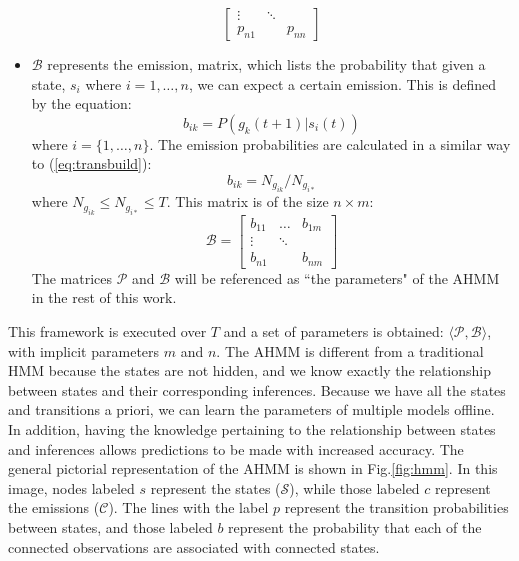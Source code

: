 \documentclass[letterpaper, 10 pt, conference]{ieeeconf}  %
\newcommand\NB[1]{$\spadesuit$\footnote{NB: #1}}
\begin{document}
\begin{itemize}
\begin{equation}
\begin{bmatrix}
                        \vdots & \ddots & \\
                        p_{n1} &    & p_{nn}
                    \end{bmatrix}
        \end{equation}
    \item $\mathcal{B}$ represents the emission, matrix, which lists the probability that given a state, $s_i$ where $i = 1,\ldots,n$, we can expect a certain emission. This is defined by the equation:
        \begin{equation} \label{eq:obsref}
            b_{ik} = P(g_k(t+1) \vert s_i(t))
        \end{equation}
        where $i = \{1,\ldots,n\}$. The emission probabilities are calculated in a similar way to (\ref{eq:transbuild}):
        \begin{equation} \label{eq:obsbuild}
            b_{ik} = N_{g_{ik}}/N_{g_{i*}}
        \end{equation} 
        where $N_{g_{ik}} \leq N_{g_{i*}} \leq T$. This matrix is of the size $n\times m$:
        \begin{equation}
            \mathcal{B} = 
                    \begin{bmatrix}
                        b_{11} & \dots & b_{1m} \\
                        \vdots & \ddots & \\
                        b_{n1} &    & b_{nm}
                    \end{bmatrix}
        \end{equation}
        The matrices $\mathcal{P}$ and $\mathcal{B}$ will be referenced as ``the parameters" of the AHMM in the rest of this work. 
\end{itemize}

This framework is executed over $T$ and a set of parameters is obtained: $\langle \mathcal{P}, \mathcal{B} \rangle$, with implicit parameters $m$ and $n$. The AHMM is different from a traditional HMM because the states are not hidden, and we know exactly the relationship
between states and their corresponding inferences. Because we have all the states and transitions a priori, we can learn the parameters of multiple models offline. In addition, having the knowledge pertaining to the relationship between states and inferences allows predictions to be made with increased accuracy.
The general pictorial representation of the AHMM is shown in Fig.\ref{fig:hmm}. In this image, nodes labeled $s$ represent the states ($\mathcal{S}$), while those labeled $c$ represent the emissions ($\mathcal{C}$). The lines with the label $p$ represent the transition probabilities between states, and those labeled $b$ represent the probability that each of the connected observations are associated with connected states.
\end{document}
